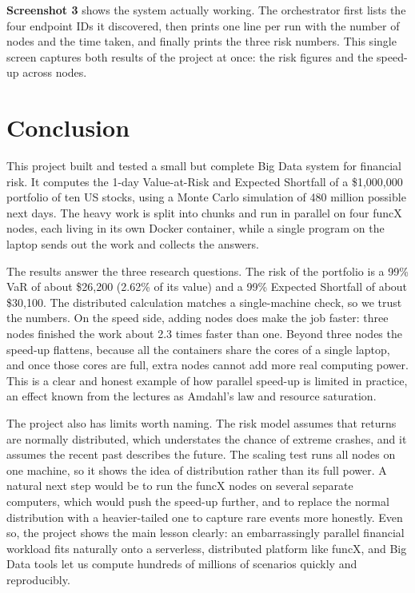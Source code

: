 \documentclass[11pt,a4paper]{article}
\begin{document}
\textbf{Screenshot 3} shows the system actually working. The orchestrator first lists the four endpoint IDs it discovered, then prints one line per run with the number of nodes and the time taken, and finally prints the three risk numbers. This single screen captures both results of the project at once: the risk figures and the speed-up across nodes.

\section{Conclusion}

This project built and tested a small but complete Big Data system for financial risk. It computes the 1-day Value-at-Risk and Expected Shortfall of a \$1,000,000 portfolio of ten US stocks, using a Monte Carlo simulation of 480 million possible next days. The heavy work is split into chunks and run in parallel on four funcX nodes, each living in its own Docker container, while a single program on the laptop sends out the work and collects the answers.

The results answer the three research questions. The risk of the portfolio is a 99\% VaR of about \$26,200 (2.62\% of its value) and a 99\% Expected Shortfall of about \$30,100. The distributed calculation matches a single-machine check, so we trust the numbers. On the speed side, adding nodes does make the job faster: three nodes finished the work about 2.3 times faster than one. Beyond three nodes the speed-up flattens, because all the containers share the cores of a single laptop, and once those cores are full, extra nodes cannot add more real computing power. This is a clear and honest example of how parallel speed-up is limited in practice, an effect known from the lectures as Amdahl's law and resource saturation.

The project also has limits worth naming. The risk model assumes that returns are normally distributed, which understates the chance of extreme crashes, and it assumes the recent past describes the future. The scaling test runs all nodes on one machine, so it shows the idea of distribution rather than its full power. A natural next step would be to run the funcX nodes on several separate computers, which would push the speed-up further, and to replace the normal distribution with a heavier-tailed one to capture rare events more honestly. Even so, the project shows the main lesson clearly: an embarrassingly parallel financial workload fits naturally onto a serverless, distributed platform like funcX, and Big Data tools let us compute hundreds of millions of scenarios quickly and reproducibly.
\end{document}
